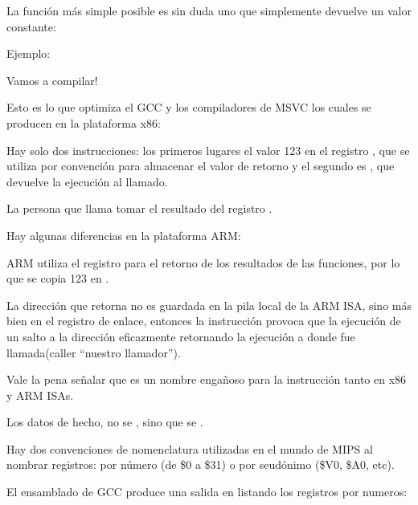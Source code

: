 
La función más simple posible es sin duda uno que simplemente devuelve un valor constante:

Ejemplo:



Vamos a compilar!


Esto es lo que optimiza el GCC  y los compiladores de MSVC los cuales se producen en la plataforma x86:



Hay solo dos instrucciones: los primeros lugares el valor 123 en el registro \EAX, que se utiliza por convención para almacenar el valor de retorno y el segundo es \RET, que devuelve la ejecución al llamado.

La persona que llama tomar el resultado del registro \EAX.


Hay algunas diferencias en la plataforma ARM:



ARM utiliza el registro  para el retorno de los resultados de las funciones, por lo que se copia 123 en .

La dirección que retorna no es guardada en la pila local de la ARM \ac{ISA}, sino más bien en el registro de enlace,
entonces la instrucción  provoca que la ejecución de un salto a la dirección eficazmente retornando la ejecución a donde fue llamada(caller ``nuestro llamador'').

Vale la pena señalar que \MOV es un nombre engañoso para la instrucción tanto en x86 y ARM \ac{ISA}s.

Los datos de hecho, no se , sino que se .


\label{MIPS_leaf_function_ex1}
Hay dos convenciones de nomenclatura utilizadas en el mundo de MIPS al nombrar registros: por número (de \$0 a \$31) o por seudónimo (\$V0, \$A0, etc).

El ensamblado de GCC produce una salida en listando los registros por numeros:

